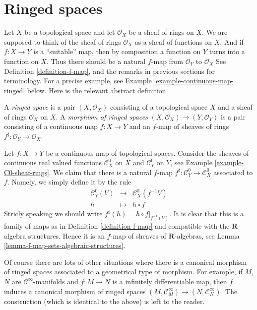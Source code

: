 \section{Ringed spaces}
\label{section-ringed-spaces}

\noindent
Let $X$ be a topological space and let $\mathcal{O}_X$
be a sheaf of rings on $X$. We are supposed to
think of the sheaf of rings $\mathcal{O}_X$ as a sheaf of functions
on $X$. And if $f : X \to Y$ is a ``suitable'' map, then by composition
a function on $Y$ turns into a function on $X$.
Thus there should be a natural
$f$-map from $\mathcal{O}_Y$ to $\mathcal{O}_X$
See Definition \ref{definition-f-map}, and the remarks in
previous sections for terminology. For a precise example, see
Example \ref{example-continuous-map-ringed} below. Here is the
relevant abstract definition.

\begin{definition}
\label{definition-ringed-space}
A {\it ringed space} is a pair $(X, \mathcal{O}_X)$ consisting
of a topological space $X$ and a sheaf of rings $\mathcal{O}_X$
on $X$. A {\it morphism of ringed spaces}
$(X, \mathcal{O}_X) \to (Y, \mathcal{O}_Y)$ is a pair
consisting of a continuous map $f : X \to Y$ and an
$f$-map of sheaves of rings
$f^\sharp : \mathcal{O}_Y \to \mathcal{O}_X$.
\end{definition}

\begin{example}
\label{example-continuous-map-ringed}
Let $f : X \to Y$ be a continuous map of topological spaces.
Consider the sheaves of continuous real valued functions
$\mathcal{C}^0_X$ on $X$ and $\mathcal{C}^0_Y$ on $Y$,
see Example \ref{example-C0-sheaf-rings}. We claim that there
is a natural $f$-map $f^\sharp : \mathcal{C}^0_Y \to \mathcal{C}^0_X$
associated to $f$. Namely, we simply define it by the
rule
\begin{eqnarray*}
\mathcal{C}^0_Y(V) & \longrightarrow & \mathcal{C}^0_X(f^{-1}V) \\
h & \longmapsto & h \circ f
\end{eqnarray*}
Stricly speaking we should write $f^\sharp(h) = h \circ f|_{f^{-1}(V)}$.
It is clear that this is a family of maps as in
Definition \ref{definition-f-map} and compatible with the $\mathbf{R}$-algebra
structures. Hence it is an $f$-map of sheaves of $\mathbf{R}$-algebras, see
Lemma \ref{lemma-f-map-sets-algebraic-structures}.

\medskip\noindent
Of course there are lots of other situations where there is
a canonical morphism of ringed spaces associated to a geometrical
type of morphism. For example, if $M$, $N$ are $\mathcal{C}^\infty$-manifolds
and $f : M \to N$ is a infinitely differentiable map, then
$f$ induces a canonical morphism of ringed spaces
$(M, \mathcal{C}_M^\infty) \to (N, \mathcal{C}^\infty_N)$.
The construction (which is identical to the above) is left
to the reader.
\end{example}


